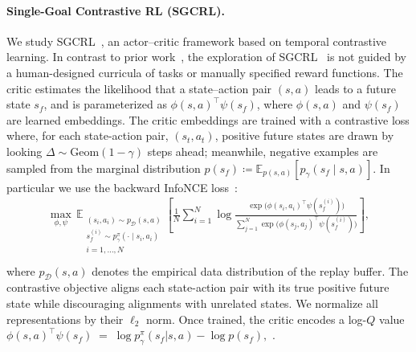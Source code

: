 \documentclass{article}
\begin{document}
\paragraph{Single-Goal Contrastive RL (SGCRL).}
We study SGCRL~\citep{liu2025a}, an actor--critic framework based on temporal contrastive learning.
In contrast to prior work~\citep{nasiriany2019planning,chane2021goal}, the exploration of SGCRL~\citep{liu2025a} is not guided by a human-designed curricula of tasks or manually specified reward functions.
The critic estimates the likelihood that a state--action pair $(s,a)$ leads to a future state $s_f$, and is parameterized as $\phi(s,a)^\top \psi(s_f)$, where $\phi(s,a)$ and $\psi(s_f)$ are learned embeddings. The critic embeddings are trained with a contrastive loss where, for each state-action pair, \((s_t,a_t)\), positive future states are drawn by looking \(\Delta \sim \mathrm{Geom}(1-\gamma)\) steps ahead; meanwhile, negative examples are sampled from the marginal distribution $p(s_f) \coloneqq \mathbb{E}_{p(s,a)}\left[p_\gamma(s_f \mid s, a)\right] $. In particular we use the backward InfoNCE loss~\citep{10.5555/3692070.3693574, liu2025a}:
\begin{equation}\label{eq:infonceloss-def}
\begin{aligned}
\max_{\phi, \psi} \,\mathbb{E}_{\substack{(s_i,a_i)\sim p_{\mathcal{D}}(s,a)\\ s_{f}^{(i)}\sim p_{\gamma}^\pi(\cdot\mid s_i,a_i)\\ i=1,\dots,N}}
\left[\frac{1}{N}\sum_{i=1}^N
\log\frac{\exp\!\big(\phi(s_i,a_i)^\top \psi(s_{f}^{(i)})\big)}
{\sum_{j=1}^N \exp\!\big(\phi(s_j,a_j)^\top \psi(s_{f}^{(i)})\big)}\right],\\[6pt]
\end{aligned}
\end{equation}
where $p_{\mathcal{D}}(s,a)$ denotes the empirical data distribution of the replay buffer. 
The contrastive objective aligns each state-action pair with its true positive future state while discouraging alignments with unrelated states. We normalize all representations by their $\ell_2$ norm. Once trained, the critic encodes a log-$Q$ value
\(
\phi(s,a)^\top \psi(s_f) \;=\; \log p_{\gamma}^{\pi}(s_f|s,a) - \log p(s_f),
\) \citep{eysenbach2022contrastive}.
\end{document}
